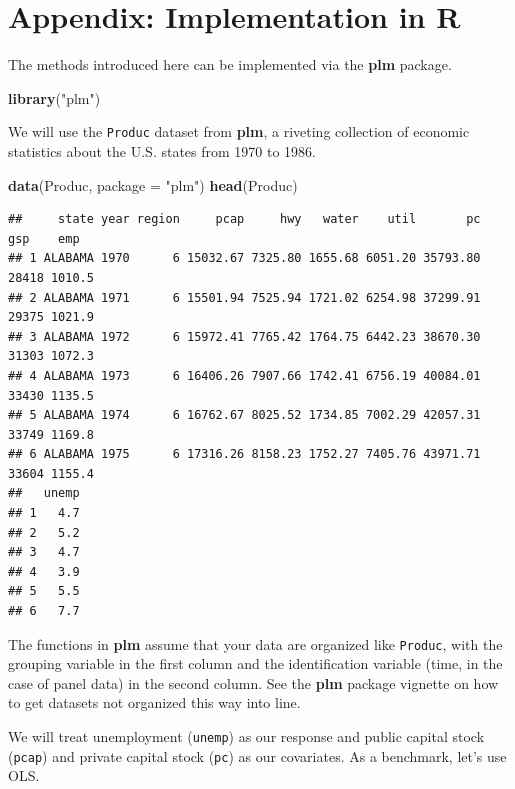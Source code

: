 \documentclass[12pt,oneside,openany]{book}
\newenvironment{Shaded}{\begin{snugshade}}{\end{snugshade}}
\newcommand{\KeywordTok}[1]{\textcolor[rgb]{0.13,0.29,0.53}{\textbf{#1}}}
\newcommand{\DataTypeTok}[1]{\textcolor[rgb]{0.13,0.29,0.53}{#1}}
\newcommand{\StringTok}[1]{\textcolor[rgb]{0.31,0.60,0.02}{#1}}
\newcommand{\NormalTok}[1]{#1}
\begin{document}
\section{Appendix: Implementation in
R}\label{appendix-implementation-in-r-1}

The methods introduced here can be implemented via the \textbf{plm}
package.

\begin{Shaded}
\begin{Highlighting}[]
\KeywordTok{library}\NormalTok{(}\StringTok{"plm"}\NormalTok{)}
\end{Highlighting}
\end{Shaded}

We will use the \texttt{Produc} dataset from \textbf{plm}, a riveting
collection of economic statistics about the U.S. states from 1970 to
1986.

\begin{Shaded}
\begin{Highlighting}[]
\KeywordTok{data}\NormalTok{(Produc, }\DataTypeTok{package =} \StringTok{"plm"}\NormalTok{)}
\KeywordTok{head}\NormalTok{(Produc)}
\end{Highlighting}
\end{Shaded}

\begin{verbatim}
##     state year region     pcap     hwy   water    util       pc   gsp    emp
## 1 ALABAMA 1970      6 15032.67 7325.80 1655.68 6051.20 35793.80 28418 1010.5
## 2 ALABAMA 1971      6 15501.94 7525.94 1721.02 6254.98 37299.91 29375 1021.9
## 3 ALABAMA 1972      6 15972.41 7765.42 1764.75 6442.23 38670.30 31303 1072.3
## 4 ALABAMA 1973      6 16406.26 7907.66 1742.41 6756.19 40084.01 33430 1135.5
## 5 ALABAMA 1974      6 16762.67 8025.52 1734.85 7002.29 42057.31 33749 1169.8
## 6 ALABAMA 1975      6 17316.26 8158.23 1752.27 7405.76 43971.71 33604 1155.4
##   unemp
## 1   4.7
## 2   5.2
## 3   4.7
## 4   3.9
## 5   5.5
## 6   7.7
\end{verbatim}

The functions in \textbf{plm} assume that your data are organized like
\texttt{Produc}, with the grouping variable in the first column and the
identification variable (time, in the case of panel data) in the second
column. See the \textbf{plm} package vignette on how to get datasets not
organized this way into line.

We will treat unemployment (\texttt{unemp}) as our response and public
capital stock (\texttt{pcap}) and private capital stock (\texttt{pc}) as
our covariates. As a benchmark, let's use OLS.
\end{document}

